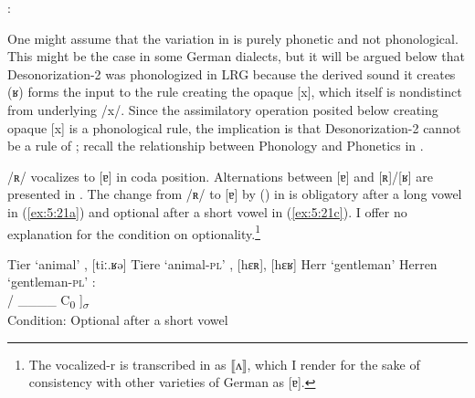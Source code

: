 \ea%
    \label{ex:5:20}
          :\smallskip\\
\z 

One might assume that the variation in  is purely phonetic and not phonological. This might be the case in some German dialects, but it will be argued below that Desonorization{}-2 was phonologized in LRG because the derived sound it creates ({\textbar}ʁ{\textbar}) forms the input to the rule creating the opaque [x], which itself is nondistinct from underlying /x/. Since the assimilatory operation posited below creating opaque [x] is a phonological rule, the implication is that Desonorization{}-2 cannot be a rule of ; recall the relationship between Phonology and Phonetics in .



/ʀ/ vocalizes to [ɐ] in coda position. Alternations between [ɐ] and [ʀ]/[ʁ] are presented in . The change from /ʀ/ to [ɐ] by  () in  is obligatory after a long vowel in (\ref{ex:5:21a}) and optional after a short vowel in (\ref{ex:5:21c}). I offer no explanation for the condition on optionality.\footnote{{The vocalized-r is transcribed in \citet{Hall1993} as ⟦ʌ⟧, which I render for the sake of consistency with other varieties of German as [ɐ].}}



\ea%
\label{ex:5:21}
\ea\label{ex:5:21a} \relax [tiːɐ]              \tab Tier   \tab ‘animal’
\ex\label{ex:5:21b} \relax [tiː.ʀə], [tiː.ʁə]  \tab Tiere  \tab ‘animal-\textsc{pl}’
\ex\label{ex:5:21c} \relax [hɛɐ], [hɛʀ], [hɛʁ] \tab Herr   \tab ‘gentleman’
\ex\label{ex:5:21d} \relax [hɛ.ʀən]            \tab Herren \tab ‘gentleman-\textsc{pl}’
\z 
\hspace{1cm}
\ex%
    \label{ex:5:22}
    :\smallskip\\
     / \_\_\_\_ C\textsubscript{0} ]\textsubscript{${\sigma}$}\smallskip\\
Condition: Optional after a short vowel
\z 


